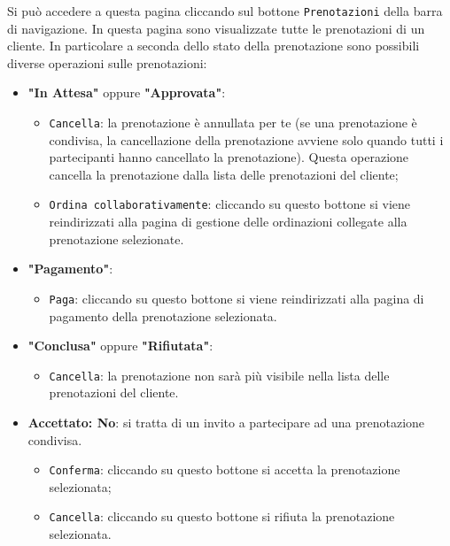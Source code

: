Si può accedere a questa pagina cliccando sul bottone \texttt{Prenotazioni} della
barra di navigazione. In questa pagina sono visualizzate tutte le prenotazioni
di un cliente. In particolare a seconda dello stato della prenotazione sono
possibili diverse operazioni sulle prenotazioni:
\begin{itemize}
	\item \textbf{"In Attesa"} oppure \textbf{"Approvata"}: 
		\begin{itemize}
			\item \texttt{Cancella}: la prenotazione è annullata per te
				(se una prenotazione è condivisa, la cancellazione della
				prenotazione avviene solo quando tutti i partecipanti hanno cancellato
				la prenotazione). Questa operazione cancella la prenotazione
				dalla lista delle prenotazioni del cliente;

			\item \texttt{Ordina collaborativamente}: cliccando su questo
				bottone si viene reindirizzati alla pagina di gestione delle
				ordinazioni collegate alla prenotazione selezionate.
		\end{itemize}

	\item \textbf{"Pagamento"}: 
		\begin{itemize}
			\item \texttt{Paga}: cliccando su questo bottone si viene
				reindirizzati alla pagina di pagamento della prenotazione
				selezionata.
		\end{itemize}

	\item \textbf{"Conclusa"} oppure \textbf{"Rifiutata"}: 
		\begin{itemize}
			\item \texttt{Cancella}: la prenotazione non sarà più visibile
				nella lista delle prenotazioni del cliente.
		\end{itemize}

	\item \textbf{Accettato: No}: si tratta di un invito a partecipare ad una
		prenotazione condivisa.
		\begin{itemize}
			\item \texttt{Conferma}: cliccando su questo bottone si accetta la
				prenotazione selezionata;

			\item \texttt{Cancella}: cliccando su questo bottone si rifiuta la
				prenotazione selezionata.
		\end{itemize}
\end{itemize}

